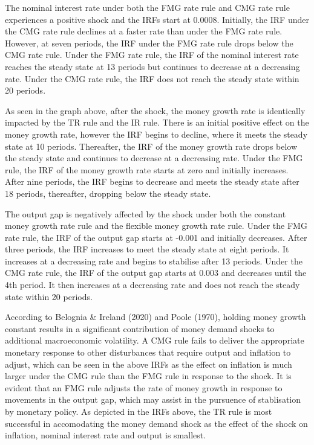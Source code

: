 \documentclass[11pt,preprint, authoryear]{elsarticle}
\numberwithin{equation}{section}
\numberwithin{figure}{section}
\numberwithin{table}{section}
\begin{document}
The nominal interest rate under both the FMG rate rule and CMG rate rule
experiences a positive shock and the IRFs start at 0.0008. Initially,
the IRF under the CMG rate rule declines at a faster rate than under the
FMG rate rule. However, at seven periods, the IRF under the FMG rate
rule drops below the CMG rate rule. Under the FMG rate rule, the IRF of
the nominal interest rate reaches the steady state at 13 periods but
continues to decrease at a decreasing rate. Under the CMG rate rule, the
IRF does not reach the steady state within 20 periods.

As seen in the graph above, after the shock, the money growth rate is
identically impacted by the TR rule and the IR rule. There is an initial
positive effect on the money growth rate, however the IRF begins to
decline, where it meets the steady state at 10 periods. Thereafter, the
IRF of the money growth rate drops below the steady state and continues
to decrease at a decreasing rate. Under the FMG rule, the IRF of the
money growth rate starts at zero and initially increases. After nine
periods, the IRF begins to decrease and meets the steady state after 18
periods, thereafter, dropping below the steady state.

The output gap is negatively affected by the shock under both the
constant money growth rate rule and the flexible money growth rate rule.
Under the FMG rate rule, the IRF of the output gap starts at -0.001 and
initially decreases. After three periods, the IRF increases to meet the
steady state at eight periods. It increases at a decreasing rate and
begins to stabilise after 13 periods. Under the CMG rate rule, the IRF
of the output gap starts at 0.003 and decreases until the 4th period. It
then increases at a decreasing rate and does not reach the steady state
within 20 periods.

According to Belognia \& Ireland (2020) and Poole (1970), holding money
growth constant results in a significant contribution of money demand
shocks to additional macroeconomic volatility. A CMG rule fails to
deliver the appropriate monetary response to other disturbances that
require output and inflation to adjust, which can be seen in the above
IRFs as the effect on inflation is much larger under the CMG rule than
the FMG rule in response to the shock. It is evident that an FMG rule
adjusts the rate of money growth in response to movements in the output
gap, which may assist in the pursuence of stablisation by monetary
policy. As depicted in the IRFs above, the TR rule is most successful in
accomodating the money demand shock as the effect of the shock on
inflation, nominal interest rate and output is smallest.
\end{document}
